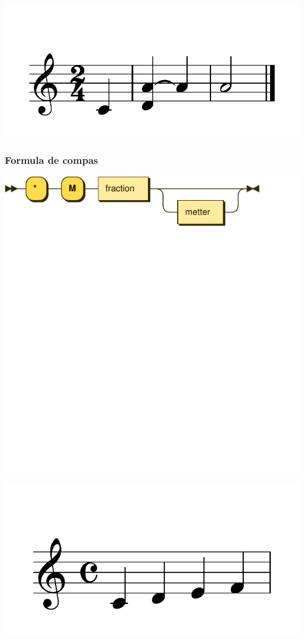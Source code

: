 \documentclass{article}
\begin{document}
\includegraphics[scale=0.5]{figures_tests/pdf/skern/ties3.pdf}

\subsubsection{Formula de compas}

\includegraphics[scale=0.5]{figures_railroad/pdf/skern/timesignature.pdf}

\includegraphics[scale=0.5]{figures_tests/pdf/skern/timesignature.pdf}
\end{document}
